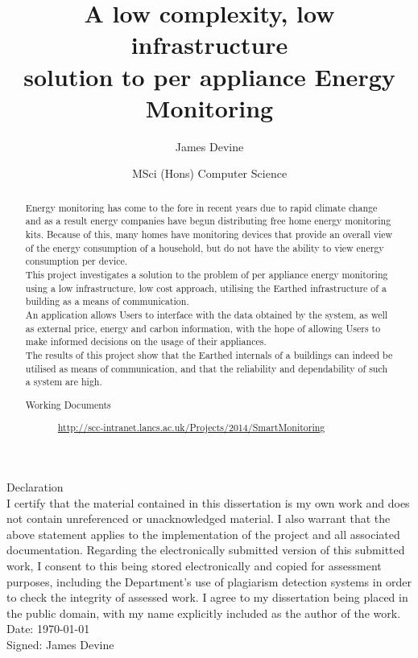 \documentclass[preprint,12pt,3p]{elsarticle}
\begin{document}
\vspace*{20px}
\title{A low complexity, low infrastructure\\ solution to per appliance Energy\\ Monitoring}%

\author{James Devine}
\address{School of Computing and Communications, Lancaster University}
\author{MSci (Hons) Computer Science}
\address{\today}

\begin{abstract}
Energy monitoring has come to the fore in recent years due to rapid climate change and as a result energy companies have begun distributing free home energy monitoring kits. Because of this, many homes have monitoring devices that provide an overall view of the energy consumption of a household, but do not have the ability to view energy consumption per device.\\ 
This project investigates a solution to the problem of per appliance energy monitoring using a low infrastructure, low cost approach, utilising the Earthed infrastructure of a building as a means of communication.\\
An application allows Users to interface with the data obtained by the system, as well as external price, energy and carbon information, with the hope of allowing Users to make informed decisions on the usage of their appliances.\\
The results of this project show that the Earthed internals of a buildings can indeed be utilised as means of communication, and that the reliability and dependability of such a system are high.
\begin{description}
\item[Working Documents]
\url{http://scc-intranet.lancs.ac.uk/Projects/2014/SmartMonitoring}

\end{description}
\end{abstract}

\pprintMaketitle
\clearpage
\begin{center}
    {\Large Declaration}\\[80pt]
    I certify that the material contained in this dissertation is my own work and does not contain unreferenced or unacknowledged material. I also warrant that the above statement applies to the implementation of the project and all associated documentation. Regarding the electronically submitted version of this submitted work, I consent to this being stored electronically and copied for assessment purposes, including the Department’s use of plagiarism detection systems in order to check the integrity of assessed work.
I agree to my dissertation being placed in the public domain, with my name explicitly included as the author of the work.\\[80pt]
Date: \today\\[20pt]
Signed: James Devine
\end{center}
\end{document}
